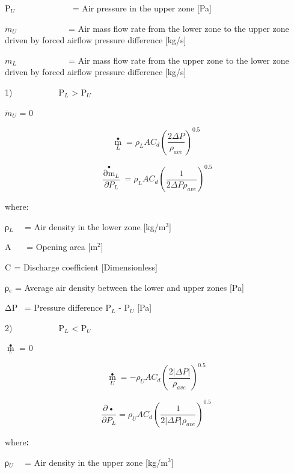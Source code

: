 P\(_{U}\)~~~~~~~~~~~~~ = Air pressure in the upper zone {[}Pa{]}

\({\dot m_U}\) ~~~~~~~~~~~ = Air mass flow rate from the lower zone to the upper zone driven by forced airflow pressure difference {[}kg/s{]}

\({\dot m_L}\) ~~~~~~~~~~~ = Air mass flow rate from the upper zone to the lower zone driven by forced airflow pressure difference {[}kg/s{]}

1)~~~~~~~~~~~P\(_{L}\) \textgreater{} P\(_{U}\)

\({\dot m_U}\) = 0

\begin{equation}
{\mathop m\limits^ \bullet_L} = {\rho_L}A{C_d}{\left( {\frac{{2\Delta P}}{{{\rho_{ave}}}}} \right)^{0.5}}
\end{equation}

\begin{equation}
\frac{{{{\mathop {\partial m}\limits^ \bullet  }_L}}}{{\partial {P_L}}} = {\rho_L}A{C_d}{\left( {\frac{1}{{2\Delta P{\rho_{ave}}}}} \right)^{0.5}}
\end{equation}

where:

ρ\(_{L}\)~~ = Air density in the lower zone {[}kg/m\(^{3}\){]}

A~~~ = Opening area {[}m\(^{2}\){]}

C\(_{ }\) = Discharge coefficient {[}Dimensionless{]}

ρ\(_{e}\) = Average air density between the lower and upper zones {[}Pa{]}

ΔP~ = Pressure difference P\(_{L}\) - P\(_{U}\) {[}Pa{]}

2)~~~~~~~~~~~P\(_{L}\) \textless{} P\(_{U}\)

\({\mathop m\limits^ \bullet_{_L}}\) = 0

\begin{equation}
{\mathop m\limits^ \bullet_U} =  - {\rho_U}A{C_d}{\left( {\frac{{2\left| {\Delta P} \right|}}{{{\rho_{ave}}}}} \right)^{0.5}}
\end{equation}

\begin{equation}
\frac{{\partial \mathop {{m_U}}\limits^ \bullet  }}{{\partial {P_L}}} = {\rho_U}A{C_d}{\left( {\frac{1}{{2\left| {\Delta P} \right|{\rho_{ave}}}}} \right)^{0.5}}
\end{equation}

where\textbf{:}

ρ\(_{U}\)~~ = Air density in the upper zone {[}kg/m\(^{3}\){]}

